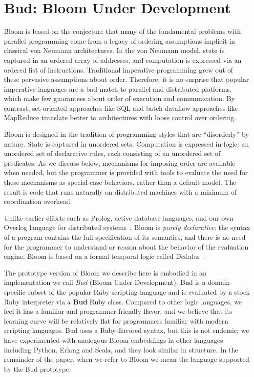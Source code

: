 \section{Bud: Bloom Under Development}
\label{sec:lang}
Bloom is based on the conjecture that many of the fundamental problems with
parallel programming come from a legacy of ordering assumptions implicit in classical von
Neumann architectures.  In the von Neumann model, state is captured in an
ordered array of addresses, and computation is expressed via an ordered list of
instructions.  Traditional imperative programming grew out of these pervasive
assumptions about order.  Therefore, it is no surprise that popular imperative
languages are a bad match to parallel and distributed platforms, which make few
guarantees about order of execution and communication. By contrast, set-oriented
approaches like SQL and batch dataflow approaches like MapReduce translate
better to architectures with loose control over ordering.

Bloom is designed in the tradition of programming styles that are ``disorderly''
by nature.  State is captured in unordered sets.  Computation is expressed
in logic: an unordered set of declarative rules, each consisting of an unordered
set of predicates.  As we discuss below, mechanisms for imposing order are
available when needed, but the programmer is provided with tools to evaluate the
need for these mechanisms as special-case behaviors, rather than a default
model.  The result is code that runs naturally on distributed machines with a
minimum of coordination overhead.
 
Unlike earlier efforts such as Prolog, active database languages, and our own
Overlog language for distributed systems~\cite{p2}, Bloom is {\em purely
  declarative}: the syntax of a program contains the full specification of its
semantics, and there is no need for the programmer to understand or reason about
the behavior of the evaluation engine.  Bloom is based on a formal temporal
logic called Dedalus~\cite{dedalus}.

The prototype version of Bloom we describe here is embodied in an implementation
we call {\em Bud} (Bloom Under Development).  Bud is a domain-specific subset of
the popular Ruby scripting language and is evaluated by a stock Ruby interpreter
via a \textbf{Bud} Ruby class.  Compared to other logic languages, we feel it
has a familiar and programmer-friendly flavor, and we believe that its learning
curve will be relatively flat for programmers familiar with modern scripting
languages.  Bud uses a Ruby-flavored syntax, but this is not endemic; we have
experimented with analogous Bloom embeddings in other languages including
Python, Erlang and Scala, and they look similar in structure.  In the remainder
of the paper, when we refer to Bloom we mean the language supported by the Bud
prototype.

